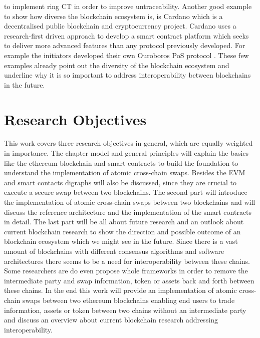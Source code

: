 \cite{maxwell2015borromean} to implement ring \ac{CT} \cite{noether2016ring} in order to improve untraceability.
Another good example to show how diverse the blockchain ecosystem is, is Cardano which is a decentralised public blockchain and cryptocurrency project. Cardano uses a research-first driven approach to develop a smart contract platform which seeks to deliver more advanced features than any protocol previously developed. For example the initiators developed their own Ouroboros \ac{PoS} protocol \cite{kiayias2017ouroboros}. These few examples already point out the diversity of the blockchain ecosystem and underline why it is so important to address interoperability between blockchains in the future.




%
%
\section{Research Objectives}
\label{sec:intro:goal}
This work covers three research objectives in general, which are equally weighted in importance. The chapter model and general principles will explain the basics like the ethereum blockchain and smart contracts to build the foundation to understand the implementation of atomic cross-chain swaps. Besides the \ac{EVM} and smart contacts digraphs will also be discussed, since they are crucial to execute a secure swap between two blockchains. The second part will introduce the implementation of atomic cross-chain swaps between two blockchains and will discuss the reference architecture and the implementation of the smart contracts in detail. The last part will be all about future research and an outlook about current blockchain research to show the direction and possible outcome of an blockchain ecosystem which we might see in the future. Since there is a vast amount of blockchains with different consensus algorithms and software architectures there seems to be a need for interoperability between these chains. Some researchers are do even propose whole frameworks in order to remove the intermediate party and swap information, token or assets back and forth between these chains. In the end this work will provide an implementation of atomic cross-chain swaps between two ethereum blockchains enabling end users to trade information, assets or token between two chains without an intermediate party and discuss an overview about current blockchain research addressing interoperability.



